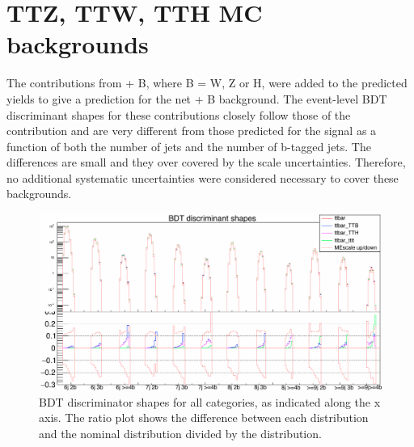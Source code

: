 \section{TTZ, TTW, TTH MC backgrounds~\label{app:TTX}}
The contributions from \ttbar + B, where B = W, Z or H, were added to the predicted \ttbar yields to give a prediction for the net \ttbar + B background. The event-level BDT discriminant shapes for these contributions closely follow those of the \ttbar contribution and are very different from those predicted for the \tttt signal as a function of both the number of jets and the number of b-tagged jets. The differences are small and they over covered by the \ttbar scale uncertainties. Therefore, no additional systematic uncertainties were considered necessary to cover these backgrounds.


\begin{figure}[ht]
\centering
    \includegraphics[width=\textwidth]{images/Run2/ttbarShapesLabels.png}
    \caption{BDT discriminator shapes for all categories, as indicated along the x axis. The ratio plot shows the difference between each distribution and the nominal \ttbar distribution divided by the \ttbar distribution.}
    \label{fig:TTB}
\end{figure}
